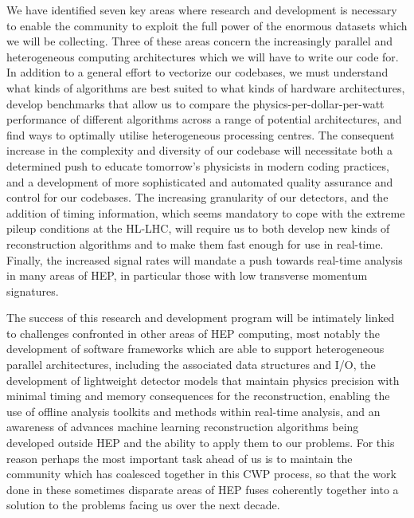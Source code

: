 We have identified seven key areas where research and development is necessary to enable the community to exploit the full power of the enormous datasets which we will be collecting. Three of these 
areas concern the increasingly parallel and heterogeneous computing architectures which we will have to write our code for. In addition to a general effort to vectorize our codebases, we must understand 
what kinds of algorithms are best suited to what kinds of hardware architectures, develop benchmarks that allow us to compare the physics-per-dollar-per-watt performance of different algorithms across a 
range of potential architectures, and find ways to optimally utilise heterogeneous processing centres. The consequent increase in the complexity and diversity of our codebase will necessitate both a 
determined push to educate tomorrow’s physicists in modern coding practices, and a development of more sophisticated and automated quality assurance and control for our codebases. The increasing granularity 
of our detectors, and the addition of timing information, which seems mandatory to cope with the extreme pileup conditions at the HL-LHC, will require us to both develop new kinds of reconstruction algorithms 
and to make them fast enough for use in real-time. Finally, the increased signal rates will mandate a push towards real-time analysis in many areas of HEP, in particular those with low transverse momentum 
signatures.

The success of this research and development program will be intimately linked to challenges confronted in other areas of HEP computing, most notably the development of software frameworks which are able 
to support heterogeneous parallel architectures, including the associated data structures and I/O, the development of lightweight detector models that maintain physics precision with minimal timing and 
memory consequences for the reconstruction, enabling the use of offline analysis toolkits and methods within real-time analysis, and an awareness of advances machine learning reconstruction algorithms 
being developed outside HEP and the ability to apply them to our problems. For this reason perhaps the most important task ahead of us is to maintain the community which has coalesced together in this 
CWP process, so that the work done in these sometimes disparate areas of HEP fuses coherently together into a solution to the problems facing us over the next decade.


 

